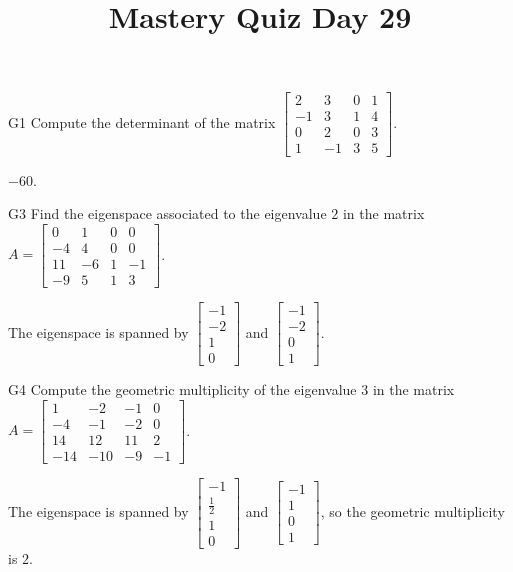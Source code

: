 \documentclass{sbgLAquiz}
\title{Mastery Quiz Day 29 }
\begin{document}
\begin{problem}{G1}
Compute the determinant of the matrix $\begin{bmatrix} 2 & 3 & 0 & 1 \\ -1 & 3 & 1 & 4 \\ 0 & 2 & 0 & 3 \\ 1 & -1 & 3 & 5 \end{bmatrix}$.
\end{problem}
\begin{solution}
$-60$.
\end{solution}

\begin{problem}{G3}
Find the eigenspace associated to the eigenvalue $2$ in the matrix $A=\begin{bmatrix} 0 & 1 & 0 & 0 \\ -4 & 4 & 0 & 0 \\ 11 & -6 & 1 & -1 \\ -9 & 5 & 1 & 3 \end{bmatrix}$.
\end{problem}
\begin{solution}
The eigenspace is spanned by $\begin{bmatrix} -1 \\ -2 \\ 1 \\ 0 \end{bmatrix}$ and $\begin{bmatrix} -1 \\ -2 \\ 0 \\ 1 \end{bmatrix}$.
\end{solution}

\begin{extract}\newpage\end{extract}
\begin{problem}{G4}
Compute the geometric multiplicity of the eigenvalue $3$ in the matrix $A=\begin{bmatrix}1 & -2 & -1 & 0 \\ -4 & -1 & -2 & 0 \\ 14 & 12 & 11 & 2 \\ -14 & -10 & -9 & -1\end{bmatrix}$.
\end{problem}
\begin{solution}
The eigenspace is spanned by $\begin{bmatrix} -1 \\ \frac{1}{2} \\ 1 \\ 0 \end{bmatrix}$ and  $\begin{bmatrix} -1 \\ 1 \\ 0 \\ 1 \end{bmatrix}$, so the geometric multiplicity is $2$.
\end{solution}
\end{document}
